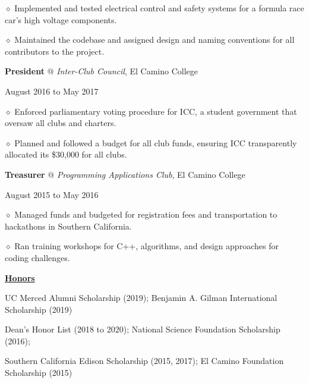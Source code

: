 \documentclass [11pt]{article}
\begin{document}
\begin{flushleft}
‭‭\quad\quad\quad$\diamond$ Implemented and tested electrical control and safety systems for a formula race car’s high voltage components.

‭‭\quad\quad\quad$\diamond$ Maintained the codebase and assigned design and naming conventions for all contributors to the project.

\linebreak
\textbf{President} @ \emph{Inter-Club Council}, El Camino College \begin{minipage}{0.565 \linewidth}\begin{flushright}August 2016 to May 2017\end{flushright}\end{minipage}

‭‭\quad\quad\quad$\diamond$ Enforced parliamentary voting procedure for ICC, a student government that oversaw all clubs and charters.

‭‭\quad\quad\quad$\diamond$ Planned and followed a budget for all club funds, ensuring ICC transparently allocated its \$30,000 for all clubs.

\linebreak
\textbf{Treasurer} @ \emph{Programming Applications Club}, El Camino College \begin{minipage}{0.450 \linewidth}\begin{flushright}August 2015 to May 2016\end{flushright}\end{minipage}

‭‭\quad\quad\quad$\diamond$ Managed funds and budgeted for registration fees and transportation to hackathons in Southern California.

‭‭\quad\quad\quad$\diamond$ Ran training workshops for C++, algorithms, and design approaches for coding challenges.

\linebreak
\underline{\textbf{Honors}}

\centering
UC Merced Alumni Scholarship (2019); Benjamin A. Gilman International Scholarship (2019)

Dean's Honor List (2018 to 2020); National Science Foundation Scholarship (2016);

Southern California Edison Scholarship (2015, 2017); El Camino Foundation Scholarship (2015)


\end{flushleft}
\end{document}
